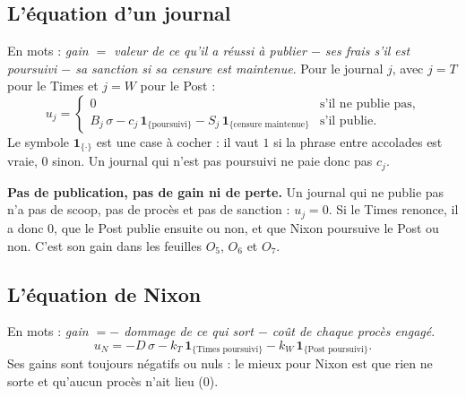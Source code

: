 \documentclass[11pt,a4paper]{article}
\theoremstyle{definition}
\newcommand{\ind}[1]{\mathbf{1}_{\{\text{#1}\}}}
\begin{document}
\subsection{L'équation d'un journal}
En mots : \emph{gain $=$ valeur de ce qu'il a réussi à publier $-$ ses frais s'il est poursuivi $-$ sa sanction si sa censure est maintenue}. Pour le journal $j$, avec $j=T$ pour le Times et $j=W$ pour le Post :
\begin{equation}
u_j=\begin{cases}
0 & \text{s'il ne publie pas,}\\[3pt]
B_j\,\sigma-c_j\,\ind{poursuivi}-S_j\,\ind{censure maintenue} & \text{s'il publie.}
\end{cases}\label{eq:uj}
\end{equation}
Le symbole $\mathbf{1}_{\{\cdot\}}$ est une case à cocher : il vaut $1$ si la phrase entre accolades est vraie, $0$ sinon. Un journal qui n'est pas poursuivi ne paie donc pas $c_j$.

\begin{resultat}
\textbf{Pas de publication, pas de gain ni de perte.} Un journal qui ne publie pas n'a pas de scoop, pas de procès et pas de sanction : $u_j=0$. Si le Times renonce, il a donc $0$, que le Post publie ensuite ou non, et que Nixon poursuive le Post ou non. C'est son gain dans les feuilles $O_5$, $O_6$ et $O_7$.
\end{resultat}

\subsection{L'équation de Nixon}
En mots : \emph{gain $=-$ dommage de ce qui sort $-$ coût de chaque procès engagé}.
\begin{equation}
u_N=-D\,\sigma-k_T\,\ind{Times poursuivi}-k_W\,\ind{Post poursuivi}. \label{eq:uN}
\end{equation}
Ses gains sont toujours négatifs ou nuls : le mieux pour Nixon est que rien ne sorte et qu'aucun procès n'ait lieu ($0$).
\end{document}

